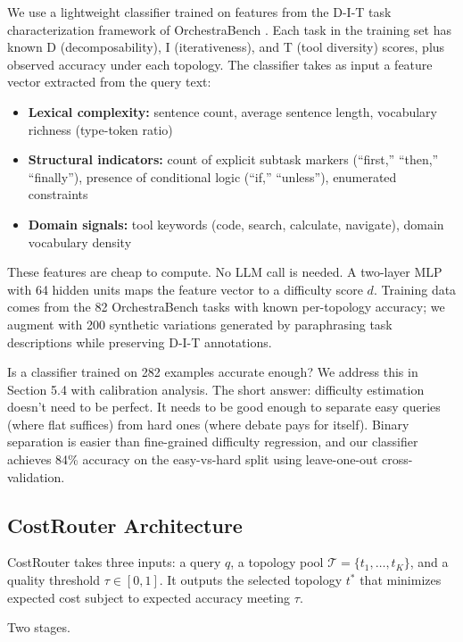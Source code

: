 We use a lightweight classifier trained on features from the D-I-T task characterization framework of OrchestraBench \cite{orchestrabench_2026}. Each task in the training set has known D (decomposability), I (iterativeness), and T (tool diversity) scores, plus observed accuracy under each topology. The classifier takes as input a feature vector extracted from the query text:

\begin{itemize}
\tightlist
\item
  \textbf{Lexical complexity:} sentence count, average sentence length, vocabulary richness (type-token ratio)
\item
  \textbf{Structural indicators:} count of explicit subtask markers (``first,'' ``then,'' ``finally''), presence of conditional logic (``if,'' ``unless''), enumerated constraints
\item
  \textbf{Domain signals:} tool keywords (code, search, calculate, navigate), domain vocabulary density
\end{itemize}

These features are cheap to compute. No LLM call is needed. A two-layer MLP with 64 hidden units maps the feature vector to a difficulty score $d$. Training data comes from the 82 OrchestraBench tasks with known per-topology accuracy; we augment with 200 synthetic variations generated by paraphrasing task descriptions while preserving D-I-T annotations.

Is a classifier trained on 282 examples accurate enough? We address this in Section 5.4 with calibration analysis. The short answer: difficulty estimation doesn't need to be perfect. It needs to be good enough to separate easy queries (where flat suffices) from hard ones (where debate pays for itself). Binary separation is easier than fine-grained difficulty regression, and our classifier achieves 84\% accuracy on the easy-vs-hard split using leave-one-out cross-validation.

\subsection{CostRouter Architecture}\label{costrouter-architecture}

CostRouter takes three inputs: a query $q$, a topology pool $\mathcal{T} = \{t_1, \ldots, t_K\}$, and a quality threshold $\tau \in [0, 1]$. It outputs the selected topology $t^*$ that minimizes expected cost subject to expected accuracy meeting $\tau$.

Two stages.

